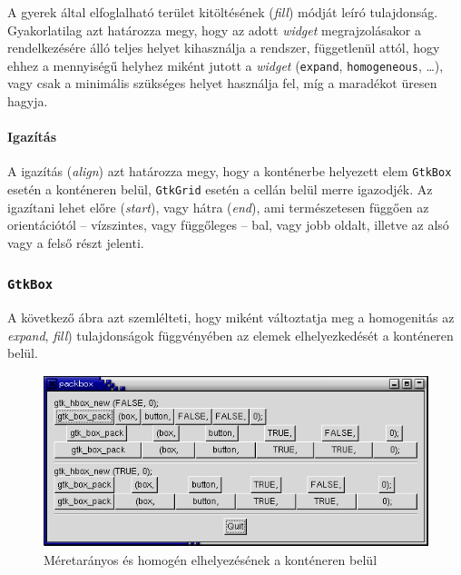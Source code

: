 A gyerek által elfoglalható terület kitöltésének (\textit{fill}) módját leíró tulajdonság. Gyakorlatilag azt határozza megy, hogy az adott \textit{widget} megrajzolásakor a rendelkezésére álló teljes helyet kihasználja a rendszer, függetlenül attól, hogy ehhez a mennyiségű helyhez miként jutott a \textit{widget} (\texttt{expand}, \texttt{homogeneous}, \dots), vagy csak a minimális szükséges helyet használja fel, míg a maradékot üresen hagyja.

\paragraph{Igazítás}

A igazítás (\textit{align}) azt határozza megy, hogy a konténerbe helyezett elem \texttt{GtkBox} esetén a konténeren belül, \texttt{GtkGrid} esetén a cellán belül merre igazodjék. Az igazítani lehet előre (\textit{start}), vagy hátra (\textit{end}), ami természetesen függően az orientációtól -- vízszintes, vagy függőleges -- bal, vagy jobb oldalt, illetve az alsó vagy a felső részt jelenti.

\subsubsection{\texttt{GtkBox}}

A következő ábra azt szemlélteti, hogy miként változtatja meg a homogenitás az \textit{expand}, \textit{fill}) tulajdonságok függvényében az elemek elhelyezkedését a konténeren belül.

\vspace{12 pt}
\begin{figure}[H]
\begin{center}
\includegraphics[height=50mm]{images/packbox1.png}
\caption{Méretarányos és homogén elhelyezésének a konténeren belül\cite{gtktut}}
\end{center}
\end{figure}

